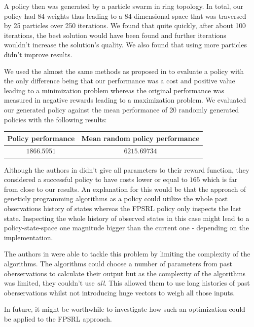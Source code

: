 \documentclass[runningheads]{llncs}
\begin{document}
    A policy then was generated by a particle swarm in ring topology.
    In total, our policy had $ 84 $ weights thus leading to a $ 84 $-dimensional space that was traversed by 25 particles over 250 iterations.
    We found that quite quickly, after about 100 iterations, the best solution would have been found and further iterations wouldn't increase the solution's quality.
    We also found that using more particles didn't improve results.

    We used the almost the same methods as proposed in \cite{Hein2018} to evaluate a policy with the only difference being that our performance was a cost and positive value leading to a minimization problem whereas the original performance was measured in negative rewards leading to a maximization problem.
    We evaluated our generated policy against the mean performance of 20 randomly generated policies with the following results:

    \begin{center}
        \begin{tabular}{c c}
            Policy performance & Mean random policy performance \\ \hline
            $ 1866.5951 $ & $ 6215.69734 $
        \end{tabular}
    \end{center}

    Although the authors in \cite{Hein2018} didn't give all parameters to their reward function, they considered a successful policy to have costs lower or equal to $ 165 $ which is far from close to our results.
    An explanation for this would be that the approach of geneticly programming algorithms as a policy could utilize the whole past observations history of states whereas the FPSRL policy only inspects the last state.
    Inspecting the whole history of observed states in this case might lead to a policy-state-space one magnitude bigger than the current one - depending on the implementation.

    The authors in \cite{Hein2018} were able to tackle this problem by limiting the complexity of the algorithms.
    The algorithms could choose a number of parameters from past oberservations to calculate their output but as the complexity of the algorithms was limited, they couldn't use \textit{all}.
    This allowed them to use long histories of past oberservations whilst not introducing huge vectors to weigh all those inputs.

    In future, it might be worthwhile to investigate how such an optimization could be applied to the FPSRL approach.
\end{document}
